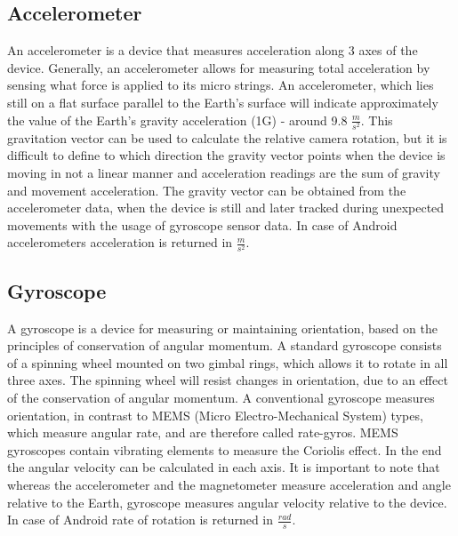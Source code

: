 \subsection[Accelerometer]{Accelerometer\cite{website:accelerometer}}
An accelerometer is a device that measures acceleration along 3 axes of the device. Generally, an accelerometer allows for measuring total acceleration by sensing what force is applied to its micro strings. An accelerometer, which lies still on a flat surface parallel to the Earth's surface will indicate approximately the value of the Earth's gravity acceleration (1G) - around 9.8 $\frac{m}{{s}^{2}}$. This gravitation vector can be used to calculate the relative camera rotation, but it is difficult to define to which direction the gravity vector points when the device is moving in not a linear manner and acceleration readings are the sum of gravity and movement acceleration. The gravity vector can be obtained from the accelerometer data, when the device is still and later tracked during unexpected movements with the usage of gyroscope sensor data. 
In case of Android accelerometers acceleration is returned in $\frac{m}{{s}^{2}}$.
\subsection[Gyroscope]{Gyroscope\cite{website:gyroscope}}
A gyroscope is a device for measuring or maintaining orientation, based on the principles of conservation of angular momentum. A standard gyroscope consists of a spinning wheel mounted on two gimbal rings, which allows it to rotate in all three axes. The spinning wheel will resist changes in orientation, due to an effect of the conservation of angular momentum. A conventional gyroscope measures orientation, in contrast to MEMS (Micro Electro-Mechanical System) types, which measure angular rate, and are therefore called rate-gyros. MEMS gyroscopes contain vibrating elements to measure the Coriolis effect. In the end the angular velocity can be calculated in each axis. It is important to note that whereas the accelerometer and the magnetometer measure acceleration and angle relative to the Earth, gyroscope measures angular velocity relative to the device.
In case of Android rate of rotation is returned in $\frac{rad}{s}$.
